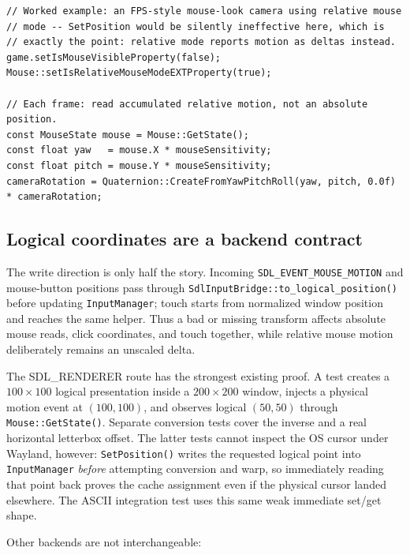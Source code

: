 \begin{lstlisting}
// Worked example: an FPS-style mouse-look camera using relative mouse
// mode -- SetPosition would be silently ineffective here, which is
// exactly the point: relative mode reports motion as deltas instead.
game.setIsMouseVisibleProperty(false);
Mouse::setIsRelativeMouseModeEXTProperty(true);

// Each frame: read accumulated relative motion, not an absolute position.
const MouseState mouse = Mouse::GetState();
const float yaw   = mouse.X * mouseSensitivity;
const float pitch = mouse.Y * mouseSensitivity;
cameraRotation = Quaternion::CreateFromYawPitchRoll(yaw, pitch, 0.0f) * cameraRotation;
\end{lstlisting}

\subsection{Logical coordinates are a backend contract}
\label{sec:input-logical-coordinate-routing}

The write direction is only half the story. Incoming
\texttt{SDL\_EVENT\_MOUSE\_MOTION} and mouse-button positions pass through
\texttt{SdlInputBridge::to\_logical\_position()} before updating
\texttt{InputManager}; touch starts from normalized window position and reaches the same
helper. Thus a bad or missing transform affects absolute mouse reads, click coordinates, and
touch together, while relative mouse motion deliberately remains an unscaled delta.

The SDL\_RENDERER route has the strongest existing proof. A test creates a
$100\times100$ logical presentation inside a $200\times200$ window, injects a physical motion
event at $(100,100)$, and observes logical $(50,50)$ through
\texttt{Mouse::GetState()}. Separate conversion tests cover the inverse and a real horizontal
letterbox offset. The latter tests cannot inspect the OS cursor under Wayland, however:
\texttt{SetPosition()} writes the requested logical point into \texttt{InputManager}
\emph{before} attempting conversion and warp, so immediately reading that point back proves
the cache assignment even if the physical cursor landed elsewhere. The ASCII integration
test uses this same weak immediate set/get shape.

Other backends are not interchangeable:

